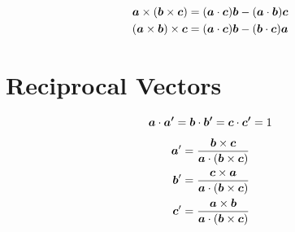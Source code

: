 \begin{align*}
    \boldsymbol{a} \times (\boldsymbol{b} \times \boldsymbol{c}) = 
    (\boldsymbol{a} \cdot \boldsymbol{c})\boldsymbol{b} - 
    (\boldsymbol{a} \cdot \boldsymbol{b})\boldsymbol{c}\\
    (\boldsymbol{a} \times \boldsymbol{b}) \times \boldsymbol{c} = 
    (\boldsymbol{a} \cdot \boldsymbol{c})\boldsymbol{b} - 
    (\boldsymbol{b} \cdot \boldsymbol{c})\boldsymbol{a}\\
\end{align*}

\section{Reciprocal Vectors}

\begin{equation*}
    \boldsymbol{a} \cdot \boldsymbol{a'} = 
    \boldsymbol{b} \cdot \boldsymbol{b'} = 
    \boldsymbol{c} \cdot \boldsymbol{c'} = 1
\end{equation*}

\begin{align*}
    \boldsymbol{a}' &= \frac{\boldsymbol{b} \times \boldsymbol{c}}
    {\boldsymbol{a} \cdot (\boldsymbol b \times \boldsymbol c)}\\
    \boldsymbol{b}' &= \frac{\boldsymbol{c} \times \boldsymbol{a}}
    {\boldsymbol{a} \cdot (\boldsymbol b \times \boldsymbol c)}\\
    \boldsymbol{c}' &= \frac{\boldsymbol{a} \times \boldsymbol{b}}
    {\boldsymbol{a} \cdot (\boldsymbol b \times \boldsymbol c)}\\
\end{align*}